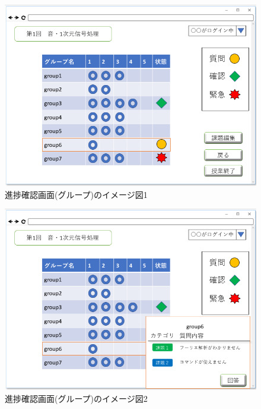 \begin{figure}[phtbp]
  \begin{center}
    \includegraphics[width=0.9\linewidth,clip]{./img/20.png}
    \caption{進捗確認画面(グループ)のイメージ図1}\label{fig:20}
  \end{center}
\end{figure}

\begin{figure}[phtbp]
  \begin{center}
    \includegraphics[width=0.9\linewidth,clip]{./img/21.png}
    \caption{進捗確認画面(グループ)のイメージ図2}\label{fig:21}
  \end{center}
\end{figure}



